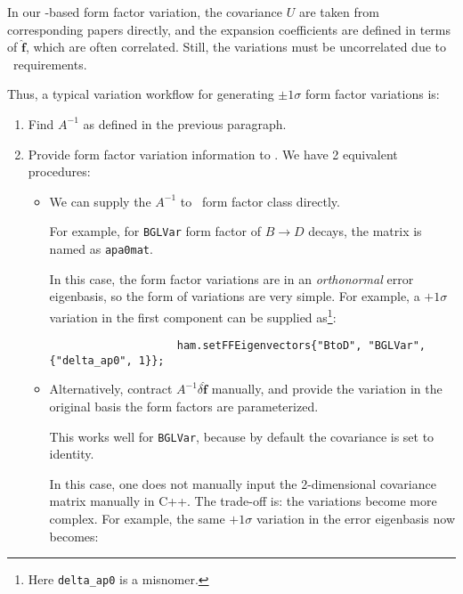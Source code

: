 In our \Hammer-based form factor variation, the covariance $U$ are taken from
corresponding papers directly, and the expansion coefficients are defined in
terms of $\bm{\hat{f}}$, which are often correlated.
Still, the variations must be uncorrelated due to \HistFactory\ requirements.

Thus, a typical variation workflow for generating $\pm 1 \sigma$ form factor
variations is:

\begin{enumerate}
    \item Find $A^{-1}$ as defined in the previous paragraph.

    \item Provide form factor variation information to \Hammer.
        We have 2 equivalent procedures:

        \begin{itemize}
            \item We can supply the $A^{-1}$ to \Hammer\ form factor class
                directly.

                For example, for \lstinline{BGLVar} form factor of $B \rightarrow D$
                decays,
                the matrix is named as \lstinline{apa0mat}.

                In this case, the form factor variations are in an
                \emph{orthonormal} error eigenbasis, so the form of variations
                are very simple. For example, a $+1\sigma$ variation in the
                first component can be supplied as\footnote{
                    Here \lstinline{delta_ap0} is a misnomer.
                }:
                \begin{lstlisting}
                    ham.setFFEigenvectors{"BtoD", "BGLVar", {"delta_ap0", 1}};
                \end{lstlisting}

            \item Alternatively, contract $A^{-1} \delta\bm{\hat{f}}$ manually,
                and provide the variation in the original basis the form factors
                are parameterized.

                This works well for \lstinline{BGLVar}, because by default the
                covariance is set to identity.

                In this case, one does not manually input the 2-dimensional
                covariance matrix manually in C++.
                The trade-off is: the variations become more complex.
                For example, the same $+1\sigma$ variation in the
                error eigenbasis now becomes:


\end{itemize}
\end{enumerate}
